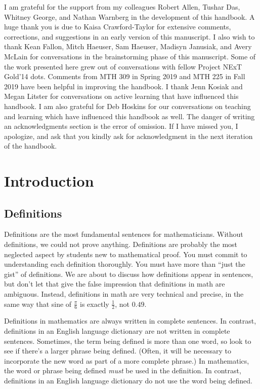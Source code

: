 \documentclass{book}
\theoremstyle{ekimcustom}
\begin{document}
I am grateful for the support from my colleagues Robert Allen, Tushar Das, Whitney George, and Nathan Warnberg in the development of this handbook. A huge thank you is due to Kaisa Crawford-Taylor for extensive comments, corrections, and suggestions in an early version of this manuscript. I also wish to thank Kean Fallon, Mitch Haeuser, Sam Haeuser, Madisyn Janusiak, and Avery McLain for conversations in the brainstorming phase of this manuscript. Some of the work presented here grew out of conversations with fellow Project NExT Gold'14 dots. Comments from MTH 309 in Spring 2019 and MTH 225 in Fall 2019 have been helpful in improving the handbook. I thank Jenn Kosiak and Megan Litster for conversations on active learning that have influenced this handbook. I am also grateful for Deb Hoskins for our conversations on teaching and learning which have influenced this handbook as well. The danger of writing an acknowledgments section is the error of omission. If I have missed you, I apologize, and ask that you kindly ask for acknowledgment in the next iteration of the handbook.


\mainmatter

\chapter{Introduction}\label{chapter:introductory}

\section{Definitions}\label{section:definitions}

Definitions are the most fundamental sentences for mathematicians. Without definitions, we could not prove anything. Definitions are probably the most neglected aspect by students new to mathematical proof. You must commit to understanding each definition thoroughly. You must have more than ``just the gist'' of definitions. We are about to discuss how definitions appear in sentences, but don't let that give the false impression that definitions in math are ambiguous. Instead, definitions in math are very technical and precise, in the same way that sine of $\frac\pi6$ is exactly $\frac12$, not $0.49$.

Definitions in mathematics are always written in complete sentences. In contrast, definitions in an English language dictionary are not written in complete sentences. Sometimes, the term being defined is more than one word, so look to see if there's a larger phrase being defined. (Often, it will be necessary to incorporate the new word as part of a more complete phrase.) In mathematics, the word or phrase being defined \emph{must} be used in the definition. In contrast, definitions in an English language dictionary do not use the word being defined.
\end{document}
